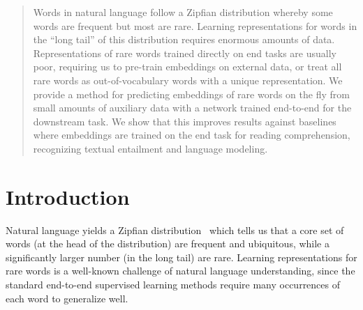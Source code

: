 
\newcommand{\pascalcomment}[1]{}  

\newcommand{\pascal}[1]{\textcolor{blue}{#1}}    

\newcommand{\previous}[1]{\textcolor{gray}{#1}}     




\maketitle

\begin{abstract}
Words in natural language follow a Zipfian distribution whereby some words are frequent but most are rare. Learning representations for words in the ``long tail'' of this distribution requires enormous amounts of data. 
Representations of rare words trained directly on end tasks are usually poor, requiring us to pre-train embeddings on external data, or treat all rare words as out-of-vocabulary words with a unique representation. We provide a method for predicting embeddings of rare words on the fly from small amounts of auxiliary data with a network trained end-to-end for the downstream task.
We show that this improves results against baselines where embeddings are trained on the end task for reading comprehension, recognizing textual entailment and language modeling.
\end{abstract}

\section{Introduction}
Natural language yields a Zipfian distribution~\citep{zipf1949human} which tells us that a core set of words (at the head of the distribution) are frequent and ubiquitous, while a significantly larger number (in the long tail) are rare. Learning representations for rare words is a well-known challenge of natural language understanding, since the standard end-to-end supervised learning methods require many occurrences of each word to generalize well.  

